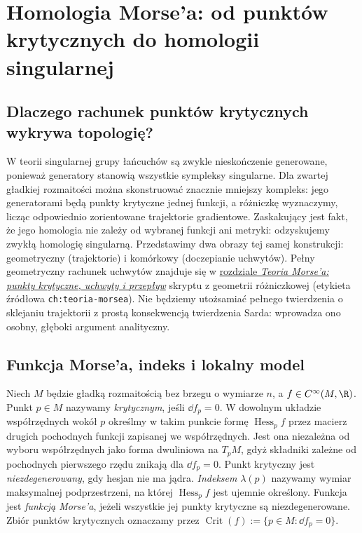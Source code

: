 \chapter{Homologia Morse'a: od punktów krytycznych do homologii singularnej}
\label{ch:morse-v10}

\providecommand{\atlasref}[2]{#2}

\section{Dlaczego rachunek punktów krytycznych wykrywa topologię?}
W teorii singularnej grupy łańcuchów są zwykle nieskończenie generowane,
ponieważ generatory stanowią wszystkie sympleksy singularne. Dla zwartej
gładkiej rozmaitości można skonstruować znacznie mniejszy kompleks:
jego generatorami będą punkty krytyczne jednej funkcji, a różniczkę
wyznaczymy, licząc odpowiednio zorientowane trajektorie gradientowe.
Zaskakujący jest fakt, że jego homologia nie zależy od wybranej
funkcji ani metryki: odzyskujemy zwykłą homologię singularną.
Przedstawimy dwa obrazy tej samej konstrukcji: geometryczny (trajektorie)
i komórkowy (doczepianie uchwytów).
Pełny geometryczny rachunek uchwytów znajduje się w
\href{https://github.com/dariusz-piekarz/mathematical_scipts/blob/biblioteka-matematyczna-iteracja-6/chapters/pl/differential_geometry_and_topology/18-teoria-morse-a-punkty-krytyczne-uchwyty-i-przeplyw.tex}{rozdziale \emph{Teoria Morse'a: punkty krytyczne, uchwyty i przepływ}}
skryptu z geometrii różniczkowej
(etykieta źródłowa \texttt{ch:teoria-morsea}).
Nie będziemy utożsamiać pełnego
twierdzenia o sklejaniu trajektorii z prostą konsekwencją twierdzenia
Sarda: wprowadza ono osobny, głęboki argument analityczny.

\section{Funkcja Morse'a, indeks i lokalny model}
\begin{definicja}
Niech $M$ będzie gładką rozmaitością bez brzegu o wymiarze $n$,
a $f\in C^\infty(M,\R)$. Punkt $p\in M$ nazywamy \emph{krytycznym}, jeśli $\dd f_p=0$.
W dowolnym układzie współrzędnych wokół $p$ określmy w takim
punkcie formę $\operatorname{Hess}_p f$ przez macierz drugich
pochodnych funkcji zapisanej we współrzędnych.
Jest ona niezależna od wyboru współrzędnych jako
forma dwuliniowa na $T_pM$, gdyż
składniki zależne od pochodnych pierwszego rzędu znikają dla $\dd f_p=0$.
Punkt krytyczny jest \emph{niezdegenerowany}, gdy hesjan nie ma jądra.
\emph{Indeksem} $\lambda(p)$ nazywamy wymiar maksymalnej podprzestrzeni,
na której $\operatorname{Hess}_pf$ jest ujemnie określony.
Funkcja jest \emph{funkcją Morse'a}, jeżeli wszystkie jej punkty
krytyczne są niezdegenerowane.
Zbiór punktów krytycznych oznaczamy przez
$\operatorname{Crit}(f):=\{p\in M:\dd f_p=0\}$.
\end{definicja}


